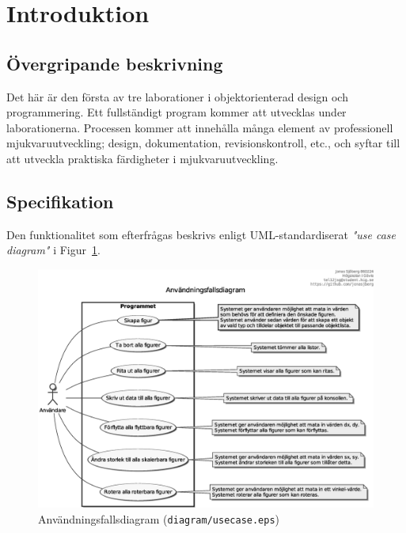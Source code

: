 %
%

\section*{Introduktion}\label{sec:intro}

\subsection*{Övergripande beskrivning}\label{sec:beskrivning}
Det här är den första av tre laborationer i objektorienterad design och
programmering. Ett fullständigt program kommer att utvecklas under
laborationerna. Processen kommer att innehålla många element av professionell
mjukvaruutveckling; design, dokumentation, revisionskontroll, etc., och syftar
till att utveckla praktiska färdigheter i mjukvaruutveckling.

\subsection*{Specifikation}
Den funktionalitet som efterfrågas beskrivs enligt UML-standardiserat
\emph{"use case diagram"} i Figur~\ref{fig:usecase}.

\begin{figure}[htbp]
\centering
\includegraphics[width=\linewidth]{diagram/usecase.eps}
\caption{Användningsfallsdiagram (\texttt{diagram/usecase.eps})}
\label{fig:usecase}
\end{figure}

